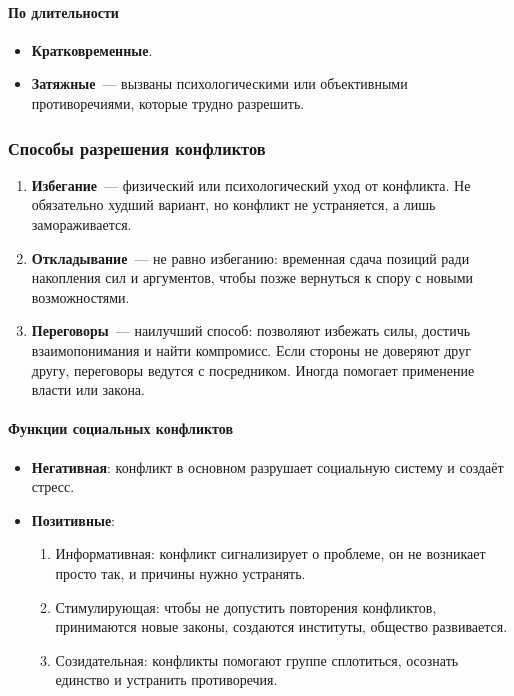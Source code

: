 \documentclass[12pt]{article}
\begin{document}
	\paragraph{По длительности}
	\begin{itemize}
		\item \textbf{Кратковременные}.
		\item \textbf{Затяжные}~--- вызваны психологическими или объективными противоречиями, которые трудно разрешить.
	\end{itemize}

	\subsubsection{Способы разрешения конфликтов}

	\begin{enumerate}
		\item \textbf{Избегание}~--- физический или психологический уход от конфликта. Не обязательно худший вариант, но конфликт не устраняется, а лишь замораживается.
		\item \textbf{Откладывание}~--- не равно избеганию: временная сдача позиций ради накопления сил и аргументов, чтобы позже вернуться к спору с новыми возможностями.
		\item \textbf{Переговоры}~--- наилучший способ: позволяют избежать силы, достичь взаимопонимания и найти компромисс. Если стороны не доверяют друг другу, переговоры ведутся с посредником. Иногда помогает применение власти или закона.
	\end{enumerate}

	\paragraph{Функции социальных конфликтов}
	\begin{itemize}
		\item \textbf{Негативная}: конфликт в основном разрушает социальную систему и создаёт стресс.
		\item \textbf{Позитивные}:
		\begin{enumerate}
			\item Информативная: конфликт сигнализирует о проблеме, он не возникает просто так, и причины нужно устранять.
			\item Стимулирующая: чтобы не допустить повторения конфликтов, принимаются новые законы, создаются институты, общество развивается.
			\item Созидательная: конфликты помогают группе сплотиться, осознать единство и устранить противоречия.
		\end{enumerate}
	\end{itemize}
\end{document}
